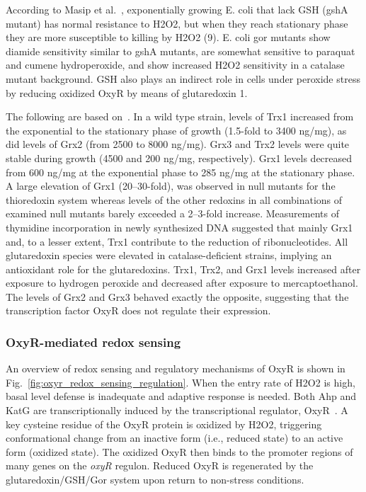 \documentclass[10pt]{article}
\begin{document}
According to Masip et al.~\cite{masip2006many}, exponentially growing E. coli that lack GSH (gshA mutant) has normal resistance to H2O2, but when they reach stationary phase they are more susceptible to killing by H2O2 (9). E. coli gor mutants show diamide sensitivity similar
to gshA mutants, are somewhat sensitive to paraquat and cumene hydroperoxide, and show increased H2O2 sensitivity in a catalase mutant background. GSH also plays an indirect role in cells under peroxide stress by reducing oxidized OxyR by means of glutaredoxin 1.

The following are based on~\cite{potamitou2002protein}. In a wild type strain, levels of Trx1 increased from the exponential to the stationary phase of growth (1.5-fold to 3400 ng/mg), as did levels of Grx2 (from 2500 to 8000 ng/mg). Grx3 and Trx2 levels were quite stable during growth (4500 and 200 ng/mg, respectively). Grx1 levels decreased from 600 ng/mg at the exponential phase to 285 ng/mg at the stationary phase. A large elevation of Grx1 (20–30-fold), was observed in null mutants for the thioredoxin system whereas levels of the other redoxins in all combinations of examined null mutants barely exceeded a 2–3-fold increase. Measurements of thymidine incorporation in newly synthesized DNA suggested that mainly Grx1 and, to a lesser extent, Trx1 contribute to the reduction of ribonucleotides. All glutaredoxin species were elevated in catalase-deficient strains, implying an antioxidant role for the glutaredoxins. Trx1, Trx2, and Grx1 levels increased after exposure to hydrogen peroxide and decreased after exposure to mercaptoethanol. The levels of Grx2 and Grx3 behaved exactly the opposite, suggesting that the transcription factor OxyR does not regulate their expression.

\subsubsection{OxyR-mediated redox sensing}

An overview of redox sensing and regulatory mechanisms of OxyR is shown in Fig.~\ref{fig:oxyr_redox_sensing_regulation}. When the entry rate of H2O2 is high, basal level defense is inadequate and adaptive response is needed. Both Ahp and KatG are transcriptionally induced by the transcriptional regulator, OxyR~\cite{hillion2015thiol}. A key cysteine residue of the OxyR protein is oxidized by H2O2, triggering conformational change from an inactive form (i.e., reduced state) to an active form (oxidized state). The oxidized OxyR then binds to the promoter regions of many genes on the \textit{oxyR} regulon. Reduced OxyR is regenerated by the glutaredoxin/GSH/Gor system upon return to non-stress conditions.  
\end{document}
